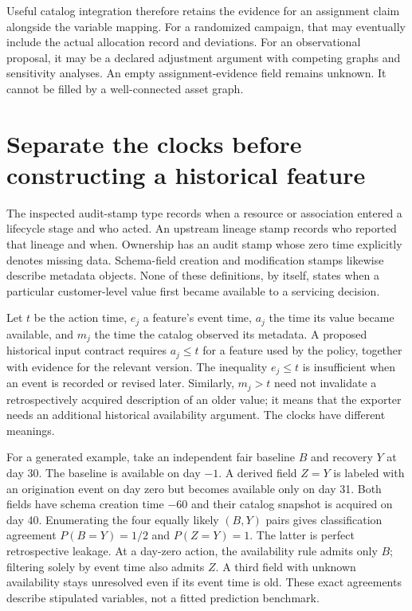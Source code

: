 Useful catalog integration therefore retains the evidence for an assignment
claim alongside the variable mapping. For a randomized campaign, that may
eventually include the actual allocation record and deviations. For an
observational proposal, it may be a declared adjustment argument with competing
graphs and sensitivity analyses. An empty assignment-evidence field remains
unknown. It cannot be filled by a well-connected asset graph.
\citep{exec16_dh_contract}

\section{Separate the clocks before constructing a historical feature}

The inspected audit-stamp type records when a resource or association entered
a lifecycle stage and who acted. An upstream lineage stamp records who
reported that lineage and when. Ownership has an audit stamp whose zero time
explicitly denotes missing data. Schema-field creation and modification stamps
likewise describe metadata objects. None of these definitions, by itself,
states when a particular customer-level value first became available to a
servicing decision. \citep{exec16_dh_primary}

Let $t$ be the action time, $e_j$ a feature's event time, $a_j$ the time its
value became available, and $m_j$ the time the catalog observed its metadata.
A proposed historical input contract requires $a_j\leq t$ for a feature used
by the policy, together with evidence for the relevant version. The inequality
$e_j\leq t$ is insufficient when an event is recorded or revised later.
Similarly, $m_j>t$ need not invalidate a retrospectively acquired description
of an older value; it means that the exporter needs an additional historical
availability argument. The clocks have different meanings.
\citep{exec16_dh_contract}

For a generated example, take an independent fair baseline $B$ and recovery
$Y$ at day 30. The baseline is available on day $-1$. A derived field $Z=Y$
is labeled with an origination event on day zero but becomes available only
on day 31. Both fields have schema creation time $-60$ and their catalog
snapshot is acquired on day 40. Enumerating the four equally likely $(B,Y)$
pairs gives classification agreement $P(B=Y)=1/2$ and $P(Z=Y)=1$.
The latter is perfect retrospective leakage. At a day-zero action, the
availability rule admits only $B$; filtering solely by event time also admits
$Z$. A third field with unknown availability stays unresolved even if its
event time is old. These exact agreements describe stipulated variables,
not a fitted prediction benchmark. \citep{exec16_dh_exact}

